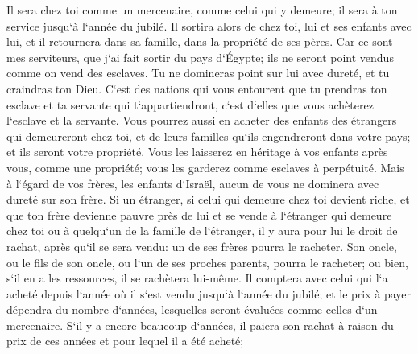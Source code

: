 \verse Il sera chez toi comme un mercenaire, comme celui qui y demeure; il sera à ton service jusqu`à l`année du jubilé. 
\verse Il sortira alors de chez toi, lui et ses enfants avec lui, et il retournera dans sa famille, dans la propriété de ses pères. 
\verse Car ce sont mes serviteurs, que j`ai fait sortir du pays d`Égypte; ils ne seront point vendus comme on vend des esclaves. 
\verse Tu ne domineras point sur lui avec dureté, et tu craindras ton Dieu. 
\verse C`est des nations qui vous entourent que tu prendras ton esclave et ta servante qui t`appartiendront, c`est d`elles que vous achèterez l`esclave et la servante. 
\verse Vous pourrez aussi en acheter des enfants des étrangers qui demeureront chez toi, et de leurs familles qu`ils engendreront dans votre pays; et ils seront votre propriété. 
\verse Vous les laisserez en héritage à vos enfants après vous, comme une propriété; vous les garderez comme esclaves à perpétuité. Mais à l`égard de vos frères, les enfants d`Israël, aucun de vous ne dominera avec dureté sur son frère. 
\verse Si un étranger, si celui qui demeure chez toi devient riche, et que ton frère devienne pauvre près de lui et se vende à l`étranger qui demeure chez toi ou à quelqu`un de la famille de l`étranger, 
\verse il y aura pour lui le droit de rachat, après qu`il se sera vendu: un de ses frères pourra le racheter. 
\verse Son oncle, ou le fils de son oncle, ou l`un de ses proches parents, pourra le racheter; ou bien, s`il en a les ressources, il se rachètera lui-même. 
\verse Il comptera avec celui qui l`a acheté depuis l`année où il s`est vendu jusqu`à l`année du jubilé; et le prix à payer dépendra du nombre d`années, lesquelles seront évaluées comme celles d`un mercenaire. 
\verse S`il y a encore beaucoup d`années, il paiera son rachat à raison du prix de ces années et pour lequel il a été acheté; 
